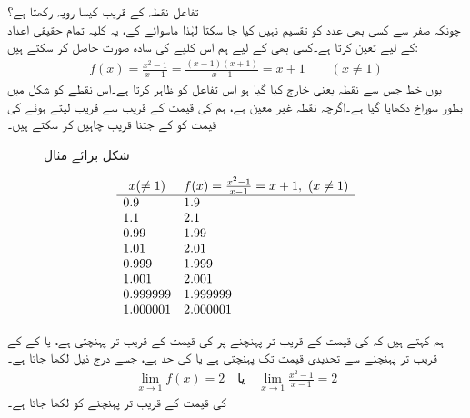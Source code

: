 تفاعل  نقطہ  کے قریب کیسا رویہ رکھتا ہے؟\\
چونکہ صفر سے کسی بھی عدد کو تقسیم نہیں کیا جا سکتا  لہٰذا ماسوائے  کے، یہ کلیہ تمام حقیقی اعداد کے لیے  تعین کرتا ہے۔کسی بھی  کے لیے ہم اس کلیے کی سادہ صورت حاصل کر سکتے ہیں:
\begin{align*}
f(x)=\frac{x^2-1}{x-1}=\frac{(x-1)(x+1)}{x-1}=x+1\quad\quad (x\ne 1)
\end{align*} 
یوں خط  جس سے نقطہ  یعنی  خارج کیا گیا ہو اس تفاعل کو ظاہر کرتا ہے۔اس نقطے  کو شکل  میں بطور سوراخ دکھایا گیا ہے۔اگرچہ نقطہ  غیر معین ہے، ہم  کی قیمت  کے قریب سے قریب لیتے ہوئے  کی قیمت کو   کے جتنا قریب چاہیں کر سکتے ہیں۔
\begin{figure}
\centering
{}
\caption{شکل برائے مثال }
\label{شکل_مثال_حد_عجیب_تفاعل_الف}
\end{figure}
%
\begin{align*}
\begin{array}{ll}
\multicolumn{1}{c}{x (\ne 1)}&\multicolumn{1}{c}{f(x)=\tfrac{x^2-1}{x-1}=x+1,\,\, (x\ne 1)}\\
\hline
0.9&1.9\\
1.1&2.1\\
0.99&1.99\\
1.01&2.01\\
0.999&1.999\\
1.001&2.001\\
0.999999&1.999999\\
1.000001&2.000001
\end{array}
\end{align*}

ہم کہتے ہیں کہ  کی قیمت  کے قریب تر   پہنچنے پر   کی قیمت  کے قریب تر   پہنچتی ہے، یا   کے    کے قریب تر پہنچنے سے  تحدیدی قیمت  تک پہنچتی ہے   یا   کی حد   ہے، جسے درج ذیل لکھا جاتا ہے۔
\begin{align*}
\lim_{x\to 1} f(x)=2 \quad \text{یا}\quad \lim_{x\to 1} \frac{x^2-1}{x-1}=2
\end{align*}
 کی قیمت  کے قریب تر  پہنچنے کو  لکھا جاتا ہے۔

